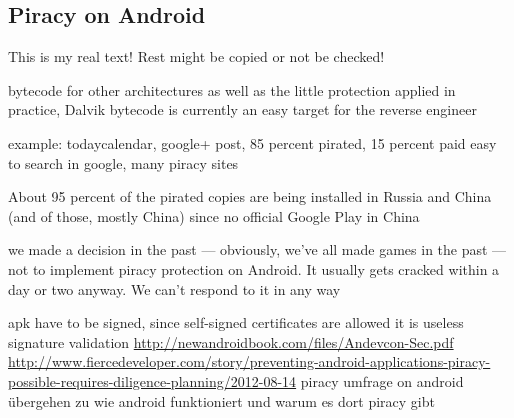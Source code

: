 \subsection{Piracy on Android }\label{subsection:foundation-piracy-android}
This is my real text! Rest might be copied or not be checked!

%
bytecode for other architectures as well as the little protection
applied in practice, Dalvik bytecode is currently an easy target for the reverse engineer
%

%

example: todaycalendar, google+ post, 85 percent pirated, 15 percent paid\cite{developersPiracy}
easy to search in google, many piracy sites

About 95 percent of the pirated copies are being installed in Russia and China (and of those, mostly China) \cite{gamasutraGentleman} since no official Google Play in China

we made a decision in the past — obviously, we’ve all made games in the past — not to implement piracy protection on Android. It usually gets cracked within a day or two anyway. We can’t respond to it in any way\cite{recodeMonument}

\cite{xdaPiracy}
%

apk have to be signed, since self-signed certificates are allowed it is useless
signature validation
\url{http://newandroidbook.com/files/Andevcon-Sec.pdf}
\url{http://www.fiercedeveloper.com/story/preventing-android-applications-piracy-possible-requires-diligence-planning/2012-08-14} piracy umfrage on android\newline
übergehen zu wie android funktioniert und warum es dort piracy gibt\newline
